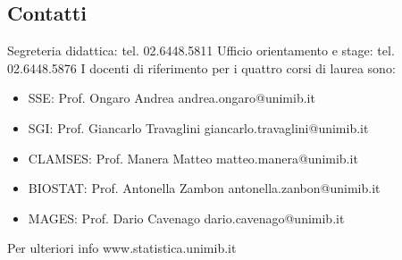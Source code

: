 \subsection{Contatti}
Segreteria didattica: tel. 02.6448.5811
Ufficio orientamento e stage: tel. 02.6448.5876
I docenti di riferimento per i quattro corsi di laurea sono: 
\begin{itemize}
\item SSE: Prof. Ongaro Andrea andrea.ongaro@unimib.it 
\item SGI: Prof. Giancarlo Travaglini giancarlo.travaglini@unimib.it 
\item CLAMSES: Prof. Manera Matteo matteo.manera@unimib.it 
\item BIOSTAT: Prof. Antonella Zambon antonella.zanbon@unimib.it 
\item MAGES: Prof. Dario Cavenago dario.cavenago@unimib.it
\end{itemize}
Per ulteriori info www.statistica.unimib.it 
